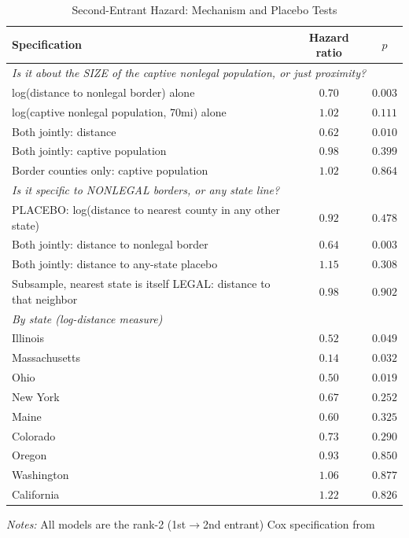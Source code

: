 \begin{table}[htbp]
\centering
\caption{Second-Entrant Hazard: Mechanism and Placebo Tests}
\label{tab:entry_hazard_mechanism}
\begin{tabular}{lcc}
\toprule
Specification & Hazard ratio & $p$ \\
\midrule
\multicolumn{3}{l}{\textit{Is it about the SIZE of the captive nonlegal population, or just proximity?}} \\
log(distance to nonlegal border) alone & $0.70$ & $0.003$ \\
log(captive nonlegal population, 70mi) alone & $1.02$ & $0.111$ \\
Both jointly: distance & $0.62$ & $0.010$ \\
Both jointly: captive population & $0.98$ & $0.399$ \\
Border counties only: captive population & $1.02$ & $0.864$ \\
\midrule
\multicolumn{3}{l}{\textit{Is it specific to NONLEGAL borders, or any state line?}} \\
PLACEBO: log(distance to nearest county in any other state) & $0.92$ & $0.478$ \\
Both jointly: distance to nonlegal border & $0.64$ & $0.003$ \\
Both jointly: distance to any-state placebo & $1.15$ & $0.308$ \\
Subsample, nearest state is itself LEGAL: distance to that neighbor & $0.98$ & $0.902$ \\
\midrule
\multicolumn{3}{l}{\textit{By state (log-distance measure)}} \\
Illinois & $0.52$ & $0.049$ \\
Massachusetts & $0.14$ & $0.032$ \\
Ohio & $0.50$ & $0.019$ \\
New York & $0.67$ & $0.252$ \\
Maine & $0.60$ & $0.325$ \\
Colorado & $0.73$ & $0.290$ \\
Oregon & $0.93$ & $0.850$ \\
Washington & $1.06$ & $0.877$ \\
California & $1.22$ & $0.826$ \\
\bottomrule
\end{tabular}
\begin{minipage}{0.95\textwidth}
\vspace{0.3em}
\footnotesize
\textit{Notes:} All models are the rank-2 (1st$\to$2nd entrant) Cox specification from

\end{minipage}
\end{table}
